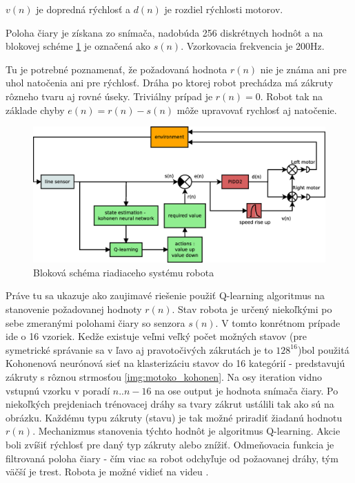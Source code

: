 $v(n)$ je dopredná rýchlosť a $d(n)$ je rozdiel rýchlosti motorov.

Poloha čiary je získana zo snímača, nadobúda 256 diskrétnych hodnôt a na blokovej schéme \ref{img:motoko_block} je
označená ako $s(n)$. Vzorkovacia frekvencia je 200Hz.

Tu je potrebné poznamenať, že požadovaná hodnota $r(n)$ nie je známa ani pre uhol natočenia ani pre rýchlosť.
Dráha po ktorej robot prechádza má zákruty rôzneho tvaru aj rovné úseky.
Triviálny prípad je $r(n) = 0$. Robot tak na základe chyby $e(n) = r(n) - s(n)$
môže upravovať rychlosť aj natočenie.

\begin{figure}[!htb]
\center
\includegraphics[scale=.3]{../diagrams/motoko_robot_block.eps}
\caption{Bloková schéma riadiaceho systému robota}
\label{img:motoko_block}
\end{figure}

Práve tu sa ukazuje ako zaujimavé riešenie použiť Q-learning algoritmus na stanovenie
požadovanej hodnoty $r(n)$. Stav robota je určený niekoľkými po sebe zmeranými polohami čiary so senzora
$s(n)$. V tomto konrétnom prípade ide o 16 vzoriek.
Kedže existuje veľmi veľký počet možných stavov (pre symetrické správanie sa
v ľavo aj pravotočivých zákrutách je to $128^16$)bol použitá Kohonenová neurónová
sieť na klasterizáciu stavov do 16 kategórií - predstavujú zákruty s rôznou strmosťou
\ref{img:motoko_kohonen}. Na osy iteration vidno vstupnú vzorku v poradí $n..n-16$
na ose output je hodnota snímača čiary. Po niekoľkých prejdeniach trénovacej dráhy
sa tvary zákrut ustálili tak ako sú na obrázku. Každému typu zákruty (stavu) je tak
možné priradiť žiadanú hodnotu $r(n)$. Mechanizmus stanovenia týchto hodnôt je algoritmus
Q-learning. Akcie boli zvíšiť rýchlosť pre daný typ zákruty alebo znížiť. Odmeňovacia funkcia
je filtrovaná poloha čiary - čím viac sa robot odchyľuje od požaovanej dráhy, tým väčší je trest.
Robota je možné vidieť na videu \cite{bib:mototko_video}.

